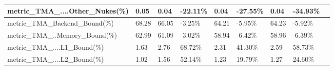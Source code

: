 \documentclass[12pt]{article}
\begin{document}
\begin{longtable}{|m{139.55pt}|m{40.35pt}|m{36.25pt}|m{36.25pt}|m{36.25pt}|m{42.10pt}|m{30.30pt}|m{44.65pt}|@{}m{0pt}@{}}
\raggedright\arraybackslash{}metric\_\allowbreak{}TMA\_\allowbreak{}....Other\_\allowbreak{}Nukes(\%) & \centering\arraybackslash{}0.05 & \centering\arraybackslash{}0.04 & \cellcolor[HTML]{D9D9D9}\centering\arraybackslash{}-22.11\% & \centering\arraybackslash{}0.04 & \cellcolor[HTML]{D9D9D9}\centering\arraybackslash{}-27.55\% & \centering\arraybackslash{}0.04 & \cellcolor[HTML]{D9D9D9}\centering\arraybackslash{}-34.93\% & \rule[-0.00pt]{0pt}{14.40pt} \\ \hline
\cellcolor[HTML]{F8CBAD}\raggedright\arraybackslash{}metric\_\allowbreak{}TMA\_\allowbreak{}Backend\_\allowbreak{}Bound(\%) & \cellcolor[HTML]{F8CBAD}\centering\arraybackslash{}68.28 & \cellcolor[HTML]{F8CBAD}\centering\arraybackslash{}66.05 & \cellcolor[HTML]{F8CBAD}\centering\arraybackslash{}-3.25\% & \cellcolor[HTML]{F8CBAD}\centering\arraybackslash{}64.21 & \cellcolor[HTML]{F8CBAD}\centering\arraybackslash{}-5.95\% & \cellcolor[HTML]{F8CBAD}\centering\arraybackslash{}64.23 & \cellcolor[HTML]{F8CBAD}\centering\arraybackslash{}-5.92\% & \rule[-0.00pt]{0pt}{14.40pt} \\ \hline
\raggedright\arraybackslash{}metric\_\allowbreak{}TMA\_\allowbreak{}..Memory\_\allowbreak{}Bound(\%) & \centering\arraybackslash{}62.99 & \centering\arraybackslash{}61.09 & \cellcolor[HTML]{D9D9D9}\centering\arraybackslash{}-3.02\% & \centering\arraybackslash{}58.94 & \cellcolor[HTML]{D9D9D9}\centering\arraybackslash{}-6.42\% & \centering\arraybackslash{}58.96 & \cellcolor[HTML]{D9D9D9}\centering\arraybackslash{}-6.39\% & \rule[-0.00pt]{0pt}{14.40pt} \\ \hline
\raggedright\arraybackslash{}metric\_\allowbreak{}TMA\_\allowbreak{}....L1\_\allowbreak{}Bound(\%) & \centering\arraybackslash{}1.63 & \centering\arraybackslash{}2.76 & \cellcolor[HTML]{D9D9D9}\centering\arraybackslash{}68.72\% & \centering\arraybackslash{}2.31 & \cellcolor[HTML]{D9D9D9}\centering\arraybackslash{}41.30\% & \centering\arraybackslash{}2.59 & \cellcolor[HTML]{D9D9D9}\centering\arraybackslash{}58.73\% & \rule[-0.00pt]{0pt}{14.40pt} \\ \hline
\raggedright\arraybackslash{}metric\_\allowbreak{}TMA\_\allowbreak{}....L2\_\allowbreak{}Bound(\%) & \centering\arraybackslash{}1.02 & \centering\arraybackslash{}1.56 & \cellcolor[HTML]{D9D9D9}\centering\arraybackslash{}52.14\% & \centering\arraybackslash{}1.23 & \cellcolor[HTML]{D9D9D9}\centering\arraybackslash{}19.79\% & \centering\arraybackslash{}1.27 & \cellcolor[HTML]{D9D9D9}\centering\arraybackslash{}24.60\% & \rule[-0.00pt]{0pt}{14.40pt} \\ \hline

\end{longtable}
\end{document}
